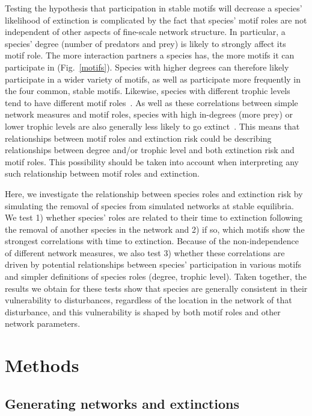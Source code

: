 \documentclass[12pt]{article}
\begin{document}
\begin{spacing}{2.0}
	Testing the hypothesis that participation in stable motifs will decrease a species' likelihood of extinction is complicated by the fact that species' motif roles are not independent of other aspects of fine-scale network structure. 
    In particular, a species' degree (number of predators and prey) is likely to strongly affect its motif role.
    The more interaction partners a species has, the more motifs it can participate in (Fig.~\ref{motifs}).
    Species with higher degrees can therefore likely participate in a wider variety of motifs, as well as participate more frequently in the four common, stable motifs.
    Likewise, species with different trophic levels tend to have different motif roles~\citep{Cirtwill2018EcolLett}.
    As well as these correlations between simple network measures and motif roles, species with high in-degrees (more prey) or lower trophic levels are also generally less likely to go extinct~\citep{Cirtwill2018FoodWebs}.
    This means that relationships between motif roles and extinction risk could be describing relationships between degree and/or trophic level and both extinction risk and motif roles.
    This possibility should be taken into account when interpreting any such relationship between motif roles and extinction.
    
    
    Here, we investigate the relationship between species roles and extinction risk by simulating the removal of species from simulated networks at stable equilibria. We test 1) whether species' roles are related to their time to extinction following the removal of another species in the network and 2) if so, which motifs show the strongest correlations with time to extinction.
    Because of the non-independence of different network measures, we also test 3) whether these correlations are driven by potential relationships between species' participation in various motifs and simpler definitions of species roles (degree, trophic level). Taken together, the results we obtain for these tests show that species are generally consistent in their vulnerability to disturbances, regardless of the location in the network of that disturbance, and this vulnerability is shaped by both motif roles and other network parameters.


\section*{Methods}

    \subsection*{Generating networks and extinctions}


\end{spacing}
\end{document}

